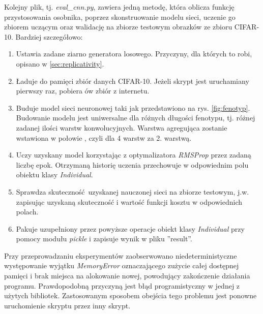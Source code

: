 Kolejny plik, tj. \textit{eval\_cnn.py}, zawiera jedną metodę, która oblicza funkcję przystosowania osobnika, poprzez skonstruowanie modelu sieci, uczenie go zbiorem uczącym oraz walidację na zbiorze testowym obrazków ze zbioru CIFAR-10.
Bardziej szczegółowo:
\begin{enumerate}
  \item Ustawia zadane ziarno generatora losowego. Przyczyny, dla których to robi, opisano w \ref{sec:replicativity}.
  \item Ładuje do pamięci zbiór danych CIFAR-10. Jeżeli skrypt jest uruchamiany pierwszy raz, pobiera ów zbiór z internetu.
  \item Buduje model sieci neuronowej taki jak przedstawiono na rys. \ref{fig:fenotyp}.
        Budowanie modelu jest uniwersalne dla różnych długości fenotypu, tj. różnej zadanej ilości warstw konwolucyjnych.
        Warstwa agregująca zostanie wstawiona w połowie , czyli dla 4 warstw za 2. warstwą.
  \item Uczy uzyskany model korzystając z optymalizatora \textit{RMSProp} przez zadaną liczbę epok. Otrzymaną historię uczenia przechowuje w odpowiednim polu obiektu klasy \textit{Individual}.\label{list:training}
  \item Sprawdza skuteczność uzyskanej nauczonej sieci na zbiorze testowym, j.w. zapisując uzyskaną skuteczność i wartość funkcji kosztu w odpowiednich polach.\label{list:check}
  \item Pakuje uzupełniony przez powyższe operacje obiekt klasy \textit{Individual} przy pomocy modułu \textit{pickle} i zapisuje wynik w pliku ''result''.
\end{enumerate}

Przy przeprowadzaniu eksperymentów zaobserwowano niedeterministyczne występowanie wyjątku \textit{MemoryError} oznaczającego zużycie całej dostępnej pamięci i brak miejsca na alokowanie nowej, powodujący zakończenie działania programu.
Prawdopodobną przyczyną jest błąd programistyczny w jednej z użytych bibliotek.
Zastosowanym sposobem obejścia tego problemu jest ponowne uruchomienie skryptu przez inny skrypt.

